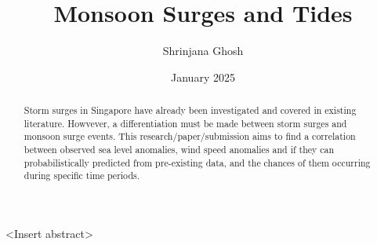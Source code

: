 \documentclass{article}
\begin{document}
\title{Monsoon Surges and Tides}
\author{Shrinjana Ghosh}
\date{January 2025}
\vfill





\maketitle

\textless Insert abstract\textgreater 

\begin{abstract}
    Storm surges in Singapore have already been investigated and covered in existing literature. Howvever, a differentiation must be made
    between storm surges and monsoon surge events. This research/paper/submission aims to find a correlation between observed sea level anomalies, wind speed anomalies
    and if they can probabilistically predicted from pre-existing data, and the chances of them occurring during specific time periods. 
\end{abstract}
\end{document}
